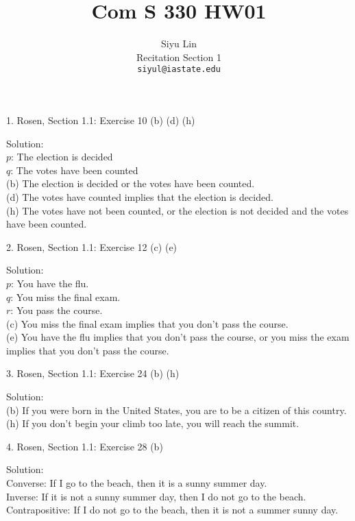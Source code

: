 \documentclass[12pt]{article}
\title{Com S 330 HW01}
\author{Siyu Lin \\Recitation Section 1\\ \texttt{siyul@iastate.edu}}
\begin{document}
\maketitle

1. Rosen, Section 1.1: Exercise 10 (b) (d) (h)

\indent Solution:\\
\indent $p$: The election is decided\\
\indent $q$: The votes have been counted\\
\indent (b) The election is decided or the votes have been counted.\\
\indent (d) The votes have counted implies that the election is decided.\\
\indent (h) The votes have not been counted, or the election is not decided and the votes have been counted.\\
\newline

2. Rosen, Section 1.1: Exercise 12 (c) (e)

\indent Solution:\\
\indent $p$: You have the flu.\\
\indent $q$: You miss the final exam.\\
\indent $r$: You pass the course.\\
\indent (c) You miss the final exam implies that you don't pass the course.\\
\indent (e) You have the flu implies that you don't pass the course, or you miss the exam implies that you don’t pass the course. \\
\newline

3. Rosen, Section 1.1: Exercise 24 (b) (h)

\indent Solution:\\
\indent (b) If you were born in the United States, you are to be a citizen of this country.\\
\indent (h) If you don't begin your climb too late, you will reach the summit.\\
\newline

4. Rosen, Section 1.1: Exercise 28 (b)

\indent Solution:\\
\indent Converse: If I go to the beach, then it is a sunny summer day.\\
\indent Inverse: If it is not a sunny summer day, then I do not go to the beach.\\
\indent Contrapositive: If I do not go to the beach, then it is not a summer sunny day.\\
\newline
\end{document}
